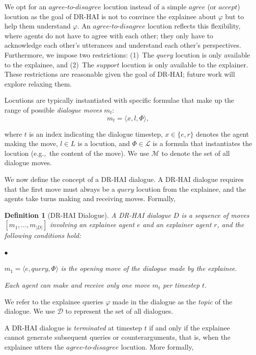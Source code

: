 \documentclass{ecai}
\newtheorem{definition}{{\bf Definition}}
\newcommand{\squishend}{\end{list}  }
\newcommand{\squishenum}{
\begin{list}{$\bullet$}{ 
    \setlength{\itemsep}{1pt}
    \setlength{\parsep}{0pt}
    \setlength{\topsep}{1.5pt}
    \setlength{\partopsep}{0pt}
    \setlength{\leftmargin}{2em}
    \setlength{\labelwidth}{1.5em}
    \setlength{\labelsep}{0.5em} } }
\begin{document}
We opt for an $agree$-$to$-$disagree$ locution instead of a simple $agree$ (or $accept$) locution as the goal of DR-HAI is not to convince the explainee about $\varphi$ but to help them understand $\varphi$. An $agree$-$to$-$disagree$ locution reflects this flexibility, where agents do not have to agree with each other; they only have to acknowledge each other's utterances and understand each other's perspectives. 
Furthermore, we impose two restrictions: (1)~The $query$ locution is only available to the explainee, and (2)~The $support$ locution is only available to the explainer. These restrictions are reasonable given the goal of DR-HAI; future work will explore relaxing them.

Locutions are typically instantiated with specific formulae that make up the range of possible \emph{dialogue moves} $m_t$:
\begin{equation}
m_t = \langle x, l, \Phi \rangle,
\end{equation}

\noindent where $t$ is an index indicating the dialogue timestep, $x\in \{e, r\}$ denotes the agent making the move, $l\in L$ is a locution, and $\Phi \in \mathcal{L}$ is a formula that instantiates the locution (e.g.,~the content of the move). We use $\mathcal{M}$ to denote the set of all dialogue moves.


We now define the concept of a DR-HAI dialogue. A DR-HAI dialogue requires that the first move must always be a $query$ locution from the explainee, and the agents take turns making and receiving moves. Formally,


\begin{definition}[DR-HAI Dialogue]
A \emph{DR-HAI dialogue} $D$ is a sequence of moves $[m_1,\ldots, m_{|D|}]$ involving an explainee agent $e$ and an explainer agent $r$, and the following conditions hold:
\squishenum
\item[1.] $m_1 = \langle e, query, \Phi \rangle$ is the opening move of the dialogue made by the explainee.
\item[2.] Each agent can make and receive only one move $m_t$ per timestep $t$.
\squishend
\label{DR_dialogue_def}
\end{definition}

\noindent We refer to the explainee queries $\varphi$ made in the dialogue as the \emph{topic} of the dialogue. We use $\mathcal{D}$ to represent the set of all dialogues.


A DR-HAI dialogue is \emph{terminated} at timestep $t$ if and only if the explainee cannot generate subsequent queries or counterarguments, that is, when the explainee utters the $agree$-$to$-$disagree$ locution. More formally,
\end{document}

